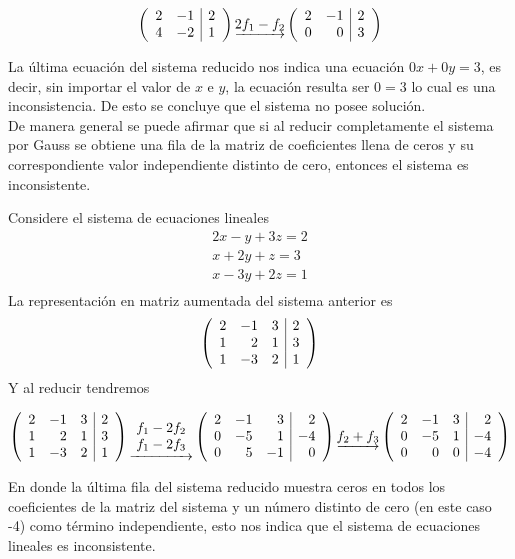 $$\reducir{rr|r}{2& -1 & 2\\4& -2 & 1\\}
\underrightarrow{2f_1 - f_2}
\reducir{rr|r}{2& -1 & 2\\0& 0 & 3\\}$$

La última ecuación del sistema reducido nos indica una ecuación $0x+0y=3$, es decir, sin importar el valor de $x$ e $y$, la ecuación resulta ser $0=3$ lo cual es una inconsistencia. De esto se concluye que el sistema no posee solución.~\\

De manera general se puede afirmar que si al reducir completamente el sistema por Gauss se obtiene una fila de la matriz de coeficientes llena de ceros y su correspondiente valor independiente distinto de cero, entonces el sistema es inconsistente.
\begin{ejemplo}
Considere el sistema de ecuaciones lineales
\begin{align*}
2x-y+3z=2\\
x+2y+z=3\\
x-3y+2z=1\\
\end{align*}
La representación en matriz aumentada del sistema anterior es
\begin{align*}
\reducir{rrr|r}{
2&-1&3&2\\
1&2&1&3\\
1&-3&2&1\\
}
\end{align*}
Y al reducir tendremos

\begin{align*}
\reducir{rrr|r}{
2&-1&3&2\\
1&2&1&3\\
1&-3&2&1\\
}
\underrightarrow{\begin{array}{c}
    f_1 - 2f_2\\
    f_1 - 2f_3
    \end{array}}
\reducir{rrr|r}{
2&-1&3&2\\
0&-5&1&-4\\
0&5&-1&0\\
}
\underrightarrow{f_2 + f_3}
\reducir{rrr|r}{
2&-1&3&2\\
0&-5&1&-4\\
0&0&0&-4\\
}
\end{align*}

En donde la última fila del sistema reducido muestra ceros en todos los coeficientes de la matriz del sistema y un número distinto de cero (en este caso -4) como término independiente, esto nos indica que el sistema de ecuaciones lineales es inconsistente.

\end{ejemplo}

